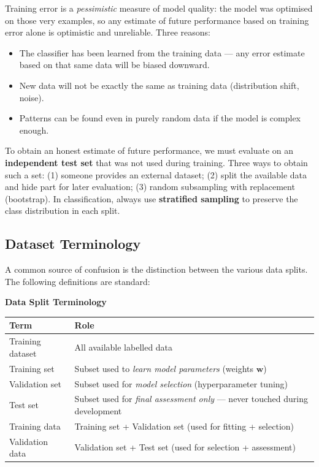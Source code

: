\documentclass[11pt,a4paper]{article}
\newcommand{\term}[1]{\textcolor{DefGreen}{\textbf{#1}}}
\begin{document}
Training error is a \emph{pessimistic} measure of model quality: the model was optimised on those very examples, so any estimate of future performance based on training error alone is optimistic and unreliable. Three reasons:
\begin{itemize}
  \item The classifier has been learned from the training data — any error estimate based on that same data will be biased downward.
  \item New data will not be exactly the same as training data (distribution shift, noise).
  \item Patterns can be found even in purely random data if the model is complex enough.
\end{itemize}

To obtain an honest estimate of future performance, we must evaluate on an \term{independent test set} that was not used during training. Three ways to obtain such a set: (1) someone provides an external dataset; (2) split the available data and hide part for later evaluation; (3) random subsampling with replacement (bootstrap). In classification, always use \term{stratified sampling} to preserve the class distribution in each split.

\subsection{Dataset Terminology}

A common source of confusion is the distinction between the various data splits. The following definitions are standard:

\begin{tcolorbox}[colback=LightBlue,colframe=AccentBlue,boxrule=0.8pt,arc=3pt]
\textbf{Data Split Terminology}\\[6pt]
\begin{tabular}{@{}ll@{}}
\toprule
\textbf{Term} & \textbf{Role} \\
\midrule
Training dataset & All available labelled data \\
Training set & Subset used to \emph{learn model parameters} (weights $\mathbf{w}$) \\
Validation set & Subset used for \emph{model selection} (hyperparameter tuning) \\
Test set & Subset used for \emph{final assessment only} — never touched during development \\
Training data & Training set + Validation set (used for fitting + selection) \\
Validation data & Validation set + Test set (used for selection + assessment) \\
\bottomrule
\end{tabular}
\end{tcolorbox}
\end{document}
